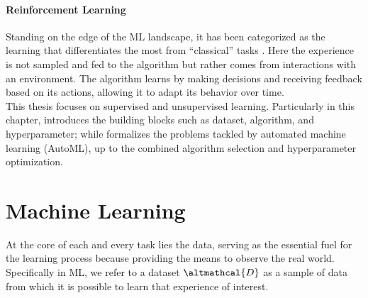 \documentclass[a4paper,12pt,times,numbered,print,index]{Classes/PhDThesisPSnPDF}
\begin{document}
\paragraph{Reinforcement Learning}
Standing on the edge of the ML landscape, it has been categorized as the learning that differentiates the most from ``classical'' tasks \cite{sutton2018reinforcement}.
Here the experience is not sampled and fed to the algorithm but rather comes from interactions with an environment.
The algorithm learns by making decisions and receiving feedback based on its actions, allowing it to adapt its behavior over time.\\

This thesis focuses on supervised and unsupervised learning.
Particularly in this chapter,  introduces the building blocks such as dataset, algorithm, and hyperparameter; while
 formalizes the problems tackled by automated machine learning (AutoML), up to the combined algorithm selection and hyperparameter optimization.

\section{Machine Learning}\label{automl-background-sec:ml}

At the core of each and every task lies the data, serving as the essential fuel for the learning process because providing the means to observe the real world.
Specifically in ML, we refer to a dataset $\altmathcal{D}$ as a sample of data from which it is possible to learn that experience of interest.
\end{document}
